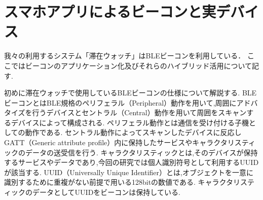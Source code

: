 \section{スマホアプリによるビーコンと実デバイス}\label{4.3}
我々の利用するシステム「滞在ウォッチ」はBLEビーコンを利用している．
ここではビーコンのアプリケーション化及びそれらのハイブリッド活用について記す.

初めに滞在ウォッチで使用しているBLEビーコンの仕様について解説する.
BLEビーコンとはBLE規格のペリフェラル（Peripheral）動作を用いて,周囲にアドバタイズを行うデバイスとセントラル（Central）動作を用いて周囲をスキャンするデバイスによって構成される.
ペリフェラル動作とは通信を受け付ける子機としての動作である.
セントラル動作によってスキャンしたデバイスに反応しGATT（Generic attribute profile）内に保持したサービスやキャラクタリスティックのデータの送受信を行う.
キャラクタリスティックとは,そのデバイスが保持するサービスやデータであり,今回の研究では個人識別符号として利用するUUIDが該当する.
UUID（Universally Unique Identifier）とは,オブジェクトを一意に識別するために重複がない前提で用いる128bitの数値である.
キャラクタリスティックのデータとしてUUIDをビーコンは保持している.









